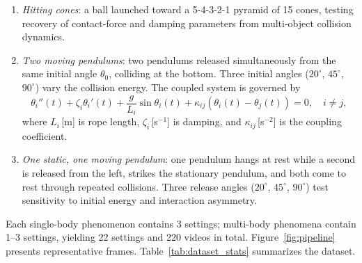 \documentclass[runningheads]{llncs}
\begin{document}
\begin{enumerate}
    \item \emph{Hitting cones}: a ball launched toward a 5-4-3-2-1 pyramid of 15 cones, testing recovery of contact-force and damping parameters from multi-object collision dynamics.
    \item \emph{Two moving pendulums}: two pendulums released simultaneously from the same initial angle $\theta_0$, colliding at the bottom. Three initial angles ($20^\circ$, $45^\circ$, $90^\circ$) vary the collision energy. The coupled system is governed by
    \begin{equation}
        \theta_i''(t) + \zeta_i\theta_i'(t) + \frac{g}{L_i}\sin\theta_i(t)
        + \kappa_{ij}(\theta_i(t) - \theta_j(t)) = 0,
        \quad i \neq j,
        \label{eq:two_pendulums}
    \end{equation}
    where $L_i$\,[m] is rope length, $\zeta_i$\,[s$^{-1}$] is damping, and $\kappa_{ij}$\,[s$^{-2}$] is the coupling coefficient.
    \item \emph{One static, one moving pendulum}: one pendulum hangs at rest while a second is released from the left, strikes the stationary pendulum, and both come to rest through repeated collisions. Three release angles ($20^\circ$, $45^\circ$, $90^\circ$) test sensitivity to initial energy and interaction asymmetry.
\end{enumerate}

Each single-body phenomenon contains 3 settings; multi-body phenomena contain 1--3 settings, yielding 22 settings and 220 videos in total. Figure~\ref{fig:pipeline} presents representative frames. Table~\ref{tab:dataset_stats} summarizes the dataset.
\end{document}

